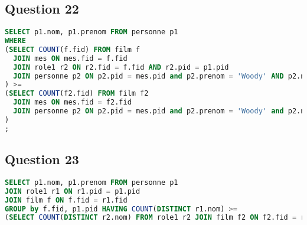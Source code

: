 \documentclass[a4paper]{article}
\begin{document}
\subsection*{Question 22}
\begin{lstlisting}[language=SQL]
SELECT p1.nom, p1.prenom FROM personne p1
WHERE
(SELECT COUNT(f.fid) FROM film f 
  JOIN mes ON mes.fid = f.fid 
  JOIN role1 r2 ON r2.fid = f.fid AND r2.pid = p1.pid
  JOIN personne p2 ON p2.pid = mes.pid and p2.prenom = 'Woody' AND p2.nom = 'Allen'
) >= 
(SELECT COUNT(f2.fid) FROM film f2 
  JOIN mes ON mes.fid = f2.fid 
  JOIN personne p2 ON p2.pid = mes.pid and p2.prenom = 'Woody' and p2.nom = 'Allen'
)
;   
\end{lstlisting}


\subsection*{Question 23}
\begin{lstlisting}[language=SQL]
SELECT p1.nom, p1.prenom FROM personne p1
JOIN role1 r1 ON r1.pid = p1.pid
JOIN film f ON f.fid = r1.fid
GROUP by f.fid, p1.pid HAVING COUNT(DISTINCT r1.nom) >= 
(SELECT COUNT(DISTINCT r2.nom) FROM role1 r2 JOIN film f2 ON f2.fid = r2.fid WHERE f2.fid = f.fid);
\end{lstlisting}
\end{document}
